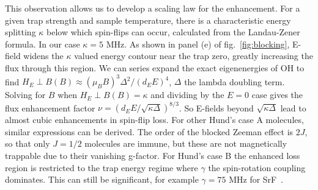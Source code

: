 \documentclass[%
 reprint,
groupedaddress,
 amsmath,amssymb,
 aps,
prl,
]{revtex4-1}
\newcommand{\epb}{$E\!\perp\!B$}
\newcommand{\epbm}{E\!\perp\!B}
\begin{document}
This observation allows us to develop a scaling law for the enhancement. For a given trap strength and sample temperature, there is a characteristic energy splitting $\kappa$ below which spin-flips can occur, calculated from the Landau-Zener formula. In our case $\kappa=5\text{ MHz}$. As shown in panel (e) of fig.~\ref{fig:blocking}, E-field widens the $\kappa$ valued energy contour near the trap zero, greatly increasing the flux through this region. We can series expand the exact eigenenergies of OH to find $H_\epbm(B)\approx (\mu_BB)^3\Delta^2/(d_EE)^4$, $\Delta$ the lambda doubling term. Solving for $B$ when $H_\epbm(B)=\kappa$ and dividing by the $E=0$ case gives the flux enhancement factor $\nu = (d_EE/\sqrt{\kappa\Delta})^{8/3}$. So E-fields beyond $\sqrt{\kappa\Delta}$ lead to almost cubic enhancements in spin-flip loss. For other Hund's case A molecules, similar expressions can be derived. The order of the blocked Zeeman effect is $2J$, so that only $J=1/2$ molecules are immune, but these are not magnetically trappable due to their vanishing g-factor. For Hund's case B the enhanced loss region is restricted to the trap energy regime where $\gamma$ the spin-rotation coupling dominates. This can still be significant, for example $\gamma=75\text{ MHz}$ for SrF~\cite{Quemener2016}. 


\end{document}
